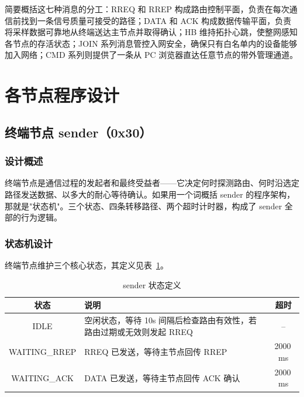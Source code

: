 \documentclass[12pt,a4paper]{ctexart}
\newcommand{\tblheaderstyle}{\sffamily\small\color{white}}
\begin{document}
简要概括这七种消息的分工：RREQ 和 RREP 构成路由控制平面，负责在每次通信前找到一条信号质量可接受的路径；DATA 和 ACK 构成数据传输平面，负责将采样数据可靠地从终端送达主节点并取得确认；HB 维持拓扑心跳，使整网感知各节点的存活状态；JOIN 系列消息管控入网安全，确保只有白名单内的设备能够加入网络；CMD 系列则提供了一条从 PC 浏览器直达任意节点的带外管理通道。

\section{各节点程序设计}
\label{sec:nodes}

\subsection{终端节点 sender（0x30）}

\subsubsection{设计概述}

终端节点是通信过程的发起者和最终受益者——它决定何时探测路由、何时沿选定路径发送数据、以多大的耐心等待确认。如果用一个词概括 sender 的程序架构，那就是"状态机"。三个状态、四条转移路径、两个超时计时器，构成了 sender 全部的行为逻辑。

\subsubsection{状态机设计}

终端节点维护三个核心状态，其定义见表~\ref{tab:senderstates}。

\begin{table}[htbp]
\centering
\caption{sender 状态定义}
\label{tab:senderstates}
\begin{tabularx}{\textwidth}{c >{\raggedright\arraybackslash}X c}
\toprule
\rowcolor{tblhead}\tblheaderstyle 状态 & \tblheaderstyle 说明 & \tblheaderstyle 超时 \\
\midrule
IDLE &
空闲状态，等待 10s 间隔后检查路由有效性，若路由过期或无效则发起 RREQ &
-- \\

WAITING\_RREP &
RREQ 已发送，等待主节点回传 RREP &
2000\,ms \\

WAITING\_ACK &
DATA 已发送，等待主节点回传 ACK 确认 &
2000\,ms \\
\bottomrule
\end{tabularx}
\end{table}
\end{document}
